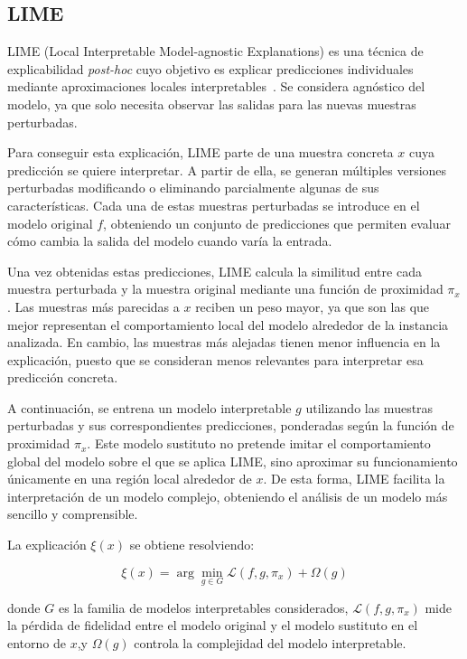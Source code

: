 \subsection{LIME}
\label{subsubsec:eda_lime}

LIME (Local Interpretable Model-agnostic Explanations) es una técnica de explicabilidad \textit{post-hoc} cuyo objetivo es explicar predicciones individuales mediante aproximaciones locales interpretables~\parencite{2016lime}. Se considera agnóstico del modelo, ya que solo necesita observar las salidas para las nuevas muestras perturbadas.

Para conseguir esta explicación, LIME parte de una muestra concreta $x$ cuya predicción se quiere interpretar. A partir de ella, se generan múltiples versiones perturbadas modificando o eliminando parcialmente algunas de sus características. Cada una de estas muestras perturbadas se introduce en el modelo original $f$, obteniendo un conjunto de predicciones que permiten evaluar cómo cambia la salida del modelo cuando varía la entrada.

Una vez obtenidas estas predicciones, LIME calcula la similitud entre cada muestra perturbada y la muestra original mediante una función de proximidad $\pi_x$. Las muestras más parecidas a $x$ reciben un peso mayor, ya que son las que mejor representan el comportamiento local del modelo alrededor de la instancia analizada. En cambio, las muestras más alejadas tienen menor influencia en la explicación, puesto que se consideran menos relevantes para interpretar esa predicción concreta.

A continuación, se entrena un modelo interpretable $g$ utilizando las muestras perturbadas y sus correspondientes predicciones, ponderadas según la función de proximidad $\pi_x$. Este modelo sustituto no pretende imitar el comportamiento global del modelo sobre el que se aplica LIME, sino aproximar su funcionamiento únicamente en una región local alrededor de $x$. De esta forma, LIME facilita la interpretación de un modelo complejo, obteniendo el análisis de un modelo más sencillo y comprensible.

La explicación $\xi(x)$ se obtiene resolviendo:

$$
\xi(x) = \arg\min_{g \in G} \mathcal{L}(f, g, \pi_x) + \Omega(g)
$$

donde $G$ es la familia de modelos interpretables considerados, $\mathcal{L}(f, g, \pi_x)$ mide la pérdida de fidelidad entre el modelo original y el modelo sustituto en el entorno de $x$,y $\Omega(g)$ controla la complejidad del modelo interpretable.

